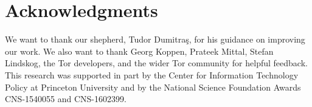 \section*{Acknowledgments}
We want to thank our shepherd, Tudor Dumitra\c{s}, for his guidance on improving
our work.  We also want to thank Georg Koppen, Prateek Mittal, Stefan Lindskog,
the Tor developers, and the wider Tor community for helpful feedback.  This
research was supported in part by the Center for Information Technology Policy
at Princeton University and by the National Science Foundation Awards
CNS-1540055 and CNS-1602399.
